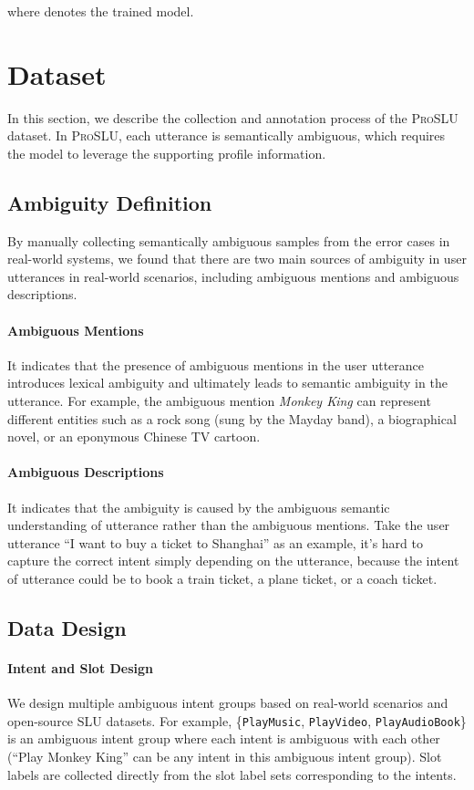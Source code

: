 \documentclass[letterpaper]{article} \usepackage{aaai22}  \usepackage{times}  \usepackage{helvet}  \usepackage{courier}  \usepackage[hyphens]{url}  \usepackage{graphicx} \urlstyle{rm} \def\UrlFont{\rm}  \usepackage{natbib}  \usepackage{caption} \DeclareCaptionStyle{ruled}{labelfont=normalfont,labelsep=colon,strut=off} \frenchspacing  \setlength{\pdfpagewidth}{8.5in}  \setlength{\pdfpageheight}{11in}  \usepackage{algorithm}
\begin{document}
where  denotes the trained model.
 \section{Dataset}
\label{Dataset}
In this section, we describe the collection and annotation process of the \textsc{ProSLU} dataset. 
In \textsc{ProSLU}, each utterance is semantically ambiguous, which requires the model to leverage the supporting profile information.
\subsection{Ambiguity Definition}
\label{sec:definition-Ambiguity}
By manually collecting semantically ambiguous samples from the error cases in real-world systems, we found that
there are two main sources of ambiguity in user utterances in real-world scenarios, including ambiguous mentions and ambiguous descriptions.
\paragraph{Ambiguous Mentions}
It indicates that the presence of ambiguous mentions in the user utterance introduces lexical ambiguity and ultimately leads to semantic ambiguity in the utterance.
For example, the ambiguous mention \textit{Monkey King} can represent different entities such as a rock song (sung by the Mayday band), a biographical novel, or an eponymous Chinese TV cartoon.

\paragraph{Ambiguous Descriptions} 
It indicates that the ambiguity is caused by the ambiguous semantic understanding of utterance rather than the ambiguous mentions.
Take the user utterance ``I want to buy a ticket to Shanghai'' as an example, it's hard to capture the correct intent simply depending on the utterance, because the intent of utterance could be to book a train ticket, a plane ticket, or a coach ticket.

\subsection{Data Design}
\paragraph{Intent and Slot Design}
We design multiple ambiguous intent groups based on real-world scenarios and open-source SLU datasets.
For example, \{\texttt{PlayMusic}, \texttt{PlayVideo}, \texttt{PlayAudioBook}\} is an ambiguous intent group where each intent is ambiguous with each other (``Play Monkey King'' can be any intent in this ambiguous intent group).
Slot labels are collected directly from the slot label sets corresponding to the intents.
\end{document}
